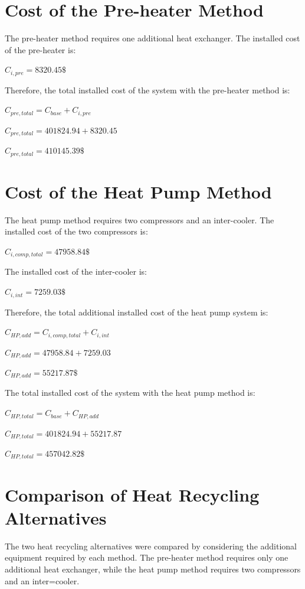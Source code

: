 \section{Cost of the Pre-heater
Method}\label{cost-of-the-pre-heater-method}

The pre-heater method requires one additional heat exchanger. The
installed cost of the pre-heater is:

\(C_{i,pre} = 8320.45 \text{\$}\)

Therefore, the total installed cost of the system with the pre-heater
method is:

\(C_{pre,total} = C_{base} + C_{i,pre}\)

\(C_{pre,total} = 401824.94 + 8320.45\)

\(C_{pre,total} = 410145.39 \text{\$}\)

\section{Cost of the Heat Pump
Method}\label{cost-of-the-heat-pump-method}

The heat pump method requires two compressors and an inter-cooler. The
installed cost of the two compressors is:

\(C_{i,comp,total} = 47958.84 \text{\$}\)

The installed cost of the inter-cooler is:

\(C_{i,int} = 7259.03 \text{\$}\)

Therefore, the total additional installed cost of the heat pump system
is:

\(C_{HP,add} = C_{i,comp,total} + C_{i,int}\)

\(C_{HP,add} = 47958.84 + 7259.03\)

\(C_{HP,add} = 55217.87 \text{\$}\)

The total installed cost of the system with the heat pump method is:

\(C_{HP,total} = C_{base} + C_{HP,add}\)

\(C_{HP,total} = 401824.94 + 55217.87\)

\(C_{HP,total} = 457042.82 \text{\$}\)

\section{Comparison of Heat Recycling
Alternatives}\label{comparison-of-heat-recycling-alternatives}

The two heat recycling alternatives were compared by considering the
additional equipment required by each method. The pre-heater method
requires only one additional heat exchanger, while the heat pump method
requires two compressors and an inter=cooler.


